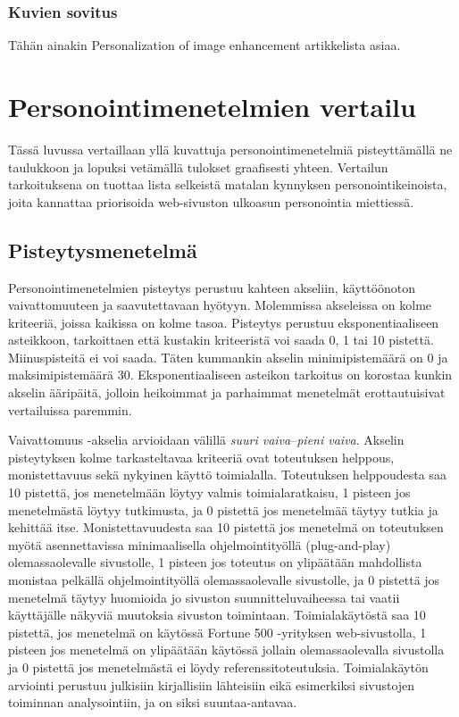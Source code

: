 \documentclass[finnish, 12pt, a4paper, elec, utf8, a-1b, online]{aaltothesis}
\begin{document}
\subsubsection{Kuvien sovitus}

Tähän ainakin Personalization of image enhancement artikkelista asiaa.

\clearpage

\section{Personointimenetelmien vertailu}

Tässä luvussa vertaillaan yllä kuvattuja personointimenetelmiä pisteyttämällä ne
taulukkoon ja lopuksi vetämällä tulokset graafisesti yhteen. Vertailun
tarkoituksena on tuottaa lista selkeistä matalan kynnyksen personointikeinoista,
joita kannattaa priorisoida web-sivuston ulkoasun personointia miettiessä.

\subsection{Pisteytysmenetelmä}

Personointimenetelmien pisteytys perustuu kahteen akseliin, käyttöönoton
vaivattomuuteen ja saavutettavaan hyötyyn. Molemmissa akseleissa on kolme
kriteeriä, joissa kaikissa on kolme tasoa. Pisteytys perustuu eksponentiaaliseen
asteikkoon, tarkoittaen että kustakin kriteeristä voi saada 0, 1 tai 10
pistettä. Miinuspisteitä ei voi saada. Täten kummankin akselin minimipistemäärä
on 0 ja maksimipistemäärä 30. Eksponentiaaliseen asteikon tarkoitus on korostaa
kunkin akselin ääripäitä, jolloin heikoimmat ja parhaimmat menetelmät
erottautuisivat vertailuissa paremmin.

Vaivattomuus -akselia arvioidaan välillä \textit{suuri vaiva}--\textit{pieni
    vaiva}. Akselin pisteytyksen kolme tarkasteltavaa kriteeriä ovat toteutuksen
helppous, monistettavuus sekä nykyinen käyttö toimialalla. Toteutuksen
helppoudesta saa 10 pistettä, jos menetelmään löytyy valmis toimialaratkaisu, 1
pisteen jos menetelmästä löytyy tutkimusta, ja 0 pistettä jos menetelmää täytyy
tutkia ja kehittää itse. Monistettavuudesta saa 10 pistettä jos menetelmä on
toteutuksen myötä asennettavissa minimaalisella ohjelmointityöllä
(plug-and-play) olemassaolevalle sivustolle, 1 pisteen jos toteutus on
ylipäätään mahdollista monistaa pelkällä ohjelmointityöllä olemassaolevalle
sivustolle, ja 0 pistettä jos menetelmä täytyy huomioida jo sivuston
suunnitteluvaiheessa tai vaatii käyttäjälle näkyviä muutoksia sivuston
toimintaan. Toimialakäytöstä saa 10 pistettä, jos menetelmä on käytössä Fortune
500 -yrityksen web-sivustolla, 1 pisteen jos menetelmä on ylipäätään käytössä
jollain olemassaolevalla sivustolla ja 0 pistettä jos menetelmästä ei löydy
referenssitoteutuksia. Toimialakäytön arviointi perustuu julkisiin kirjallisiin
lähteisiin eikä esimerkiksi sivustojen toiminnan analysointiin, ja on siksi
suuntaa-antavaa.
\end{document}
